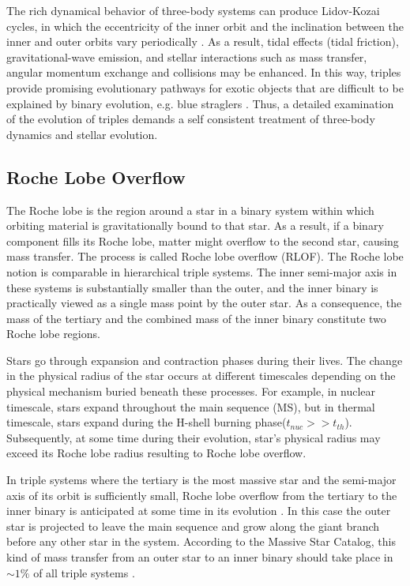 The rich dynamical behavior of three-body systems can produce Lidov-Kozai cycles, in which the eccentricity of the inner orbit and the inclination between the inner and outer orbits vary periodically \citep{michaely2014secular,toonen2016evolution,mangipudi2022extreme}. As a result, tidal effects (tidal friction), gravitational-wave emission, and stellar interactions such as mass transfer, angular momentum exchange and collisions may be enhanced. In this way, triples provide promising evolutionary pathways for exotic objects \citep{sana2012binary, toonen2016evolution} that are difficult to be explained by binary evolution, e.g. blue straglers \citet{winn2009spin}. Thus, a detailed examination of the evolution of triples demands a self consistent treatment of three-body dynamics and stellar evolution.

\subsection{Roche Lobe Overflow}

The Roche lobe is the region around a star in a binary system within which orbiting material is gravitationally bound to that star. As a result, if a binary component fills its Roche lobe, matter might overflow to the second star, causing mass transfer. The process is called Roche lobe overflow (RLOF). The Roche lobe notion is comparable in hierarchical triple systems. The inner semi-major axis in these systems is substantially smaller than the outer, and the inner binary is practically viewed as a single mass point by the outer star. As a consequence, the mass of the tertiary and the combined mass of the inner binary constitute two Roche lobe regions.

Stars go through expansion and contraction phases during their lives. The change in the physical radius of the star occurs at different timescales depending on the physical mechanism buried beneath these processes. For example, in nuclear timescale, stars expand throughout the main sequence (MS), but in thermal timescale, stars expand during the H-shell burning phase($t_{nuc} >> t_{th}$). Subsequently, at some time during their evolution, star's physical radius may exceed its Roche lobe radius resulting to Roche lobe overflow.

In triple systems where the tertiary is the most massive star and the semi-major axis of its orbit is sufficiently small, Roche lobe overflow from the tertiary to the inner binary is anticipated at some time in its evolution \citep{de2014evolution}. In this case the outer star is projected to leave the main sequence and grow along the giant branch before any other star in the system. According to the Massive Star Catalog, this kind of mass transfer from an outer star to an inner binary should take place in $ \sim 1\%$ of all triple systems \citep{de2014evolution,hamers2022statistical}. 


